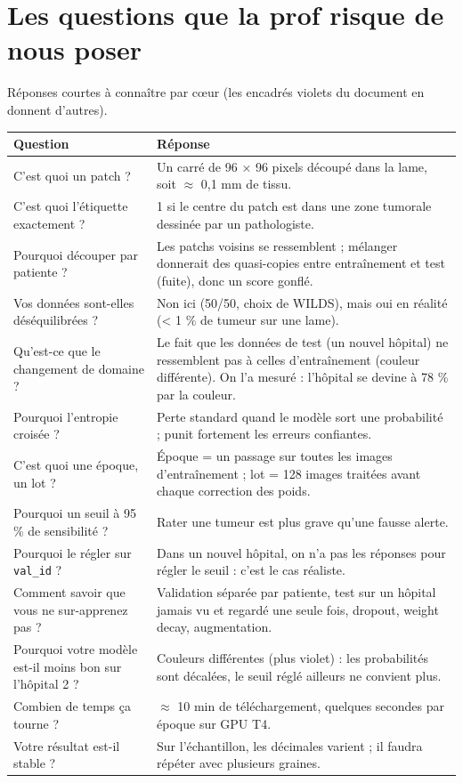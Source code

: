 \documentclass[11pt,a4paper]{article}
\begin{document}
\section{Les questions que la prof risque de nous poser}
Réponses courtes à connaître par cœur (les encadrés violets du document en donnent d'autres).

\begin{table}[H]
\centering
\small
\begin{tabularx}{\textwidth}{>{\raggedright\arraybackslash}p{5.3cm}X}
\toprule
\textbf{Question} & \textbf{Réponse} \\
\midrule
C'est quoi un patch ? & Un carré de 96 × 96 pixels découpé dans la lame, soit $\approx$ 0,1 mm de tissu. \\
C'est quoi l'étiquette exactement ? & 1 si le centre du patch est dans une zone tumorale dessinée par un
pathologiste. \\
Pourquoi découper par patiente ? & Les patchs voisins se ressemblent ; mélanger donnerait des quasi-copies
entre entraînement et test (fuite), donc un score gonflé. \\
Vos données sont-elles déséquilibrées ? & Non ici (50/50, choix de WILDS), mais oui en réalité (< 1 \% de
tumeur sur une lame). \\
Qu'est-ce que le changement de domaine ? & Le fait que les données de test (un nouvel hôpital) ne ressemblent
pas à celles d'entraînement (couleur différente). On l'a mesuré : l'hôpital se devine à 78 \% par la couleur. \\
Pourquoi l'entropie croisée ? & Perte standard quand le modèle sort une probabilité ; punit fortement les
erreurs confiantes. \\
C'est quoi une époque, un lot ? & Époque = un passage sur toutes les images d'entraînement ; lot = 128 images
traitées avant chaque correction des poids. \\
Pourquoi un seuil à 95 \% de sensibilité ? & Rater une tumeur est plus grave qu'une fausse alerte. \\
Pourquoi le régler sur \texttt{val\_id} ? & Dans un nouvel hôpital, on n'a pas les réponses pour régler le
seuil : c'est le cas réaliste. \\
Comment savoir que vous ne sur-apprenez pas ? & Validation séparée par patiente, test sur un hôpital jamais vu
et regardé une seule fois, dropout, weight decay, augmentation. \\
Pourquoi votre modèle est-il moins bon sur l'hôpital 2 ? & Couleurs différentes (plus violet) : les
probabilités sont décalées, le seuil réglé ailleurs ne convient plus. \\
Combien de temps ça tourne ? & $\approx$ 10 min de téléchargement, quelques secondes par époque sur GPU T4. \\
Votre résultat est-il stable ? & Sur l'échantillon, les décimales varient ; il faudra répéter avec plusieurs
graines. \\
\bottomrule
\end{tabularx}
\end{table}
\end{document}
